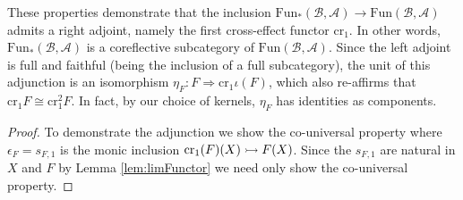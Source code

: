 These properties demonstrate that the inclusion $\text{Fun}_*(\mathcal{B},\mathcal{A})\rightarrow \text{Fun}(\mathcal{B},\mathcal{A})$ admits a right adjoint, namely the first cross-effect functor $\text{cr}_1$. In other words, $\text{Fun}_*(\mathcal{B},\mathcal{A})$ is a coreflective subcategory of $\text{Fun}(\mathcal{B},\mathcal{A})$. Since the left adjoint is full and faithful (being the inclusion of a full subcategory), the unit of this adjunction is an isomorphism $\eta_F:F\Rightarrow \text{cr}_1\iota(F)$, which also re-affirms that $\text{cr}_1F\cong \text{cr}_1^2F$. In fact, by our choice of kernels, $\eta_F$ has identities as components.
\begin{proof}
    To demonstrate the adjunction we show the co-universal property where $\epsilon_F = s_{F,1}$ is the monic inclusion $\text{cr}_1(F)(X)\rightarrowtail F(X)$. Since the $s_{F,1}$ are natural in $X$ and $F$ by Lemma \ref{lem:limFunctor} we need only show the co-universal property.


\end{proof}
